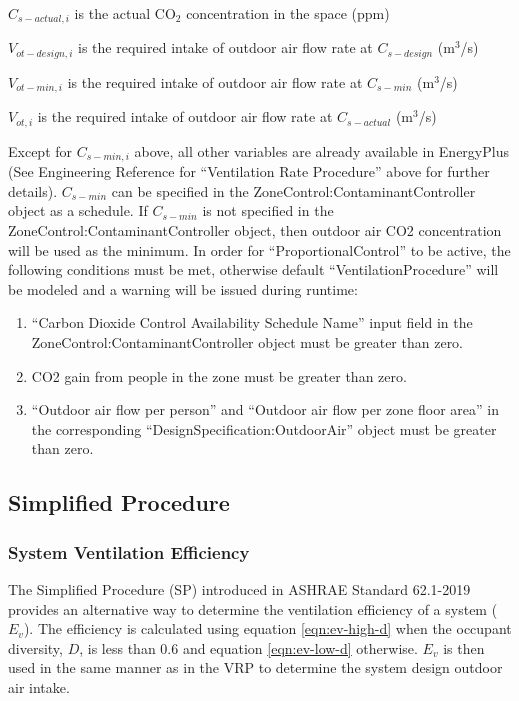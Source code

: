 \({C_{s - actual,i}}\) is the actual CO\(_{2}\) concentration in the space (ppm)

\({V_{ot - design,i}}\) is the required intake of outdoor air flow rate at \({C_{s - design}}\) (m\(^{3}\)/s)

\({V_{ot - min,i}}\) is the required intake of outdoor air flow rate at \({C_{s - min}}\) (m\(^{3}\)/s)

\({V_{ot,i}}\) is the required intake of outdoor air flow rate at \({C_{s - actual}}\) (m\(^{3}\)/s)

Except for \({C_{s - min,i}}\) above, all other variables are already available in EnergyPlus (See Engineering Reference for ``Ventilation Rate Procedure'' above for further details). \({C_{s - min}}\) can be specified in the ZoneControl:ContaminantController object as a schedule. If \({C_{s - min}}\) is not specified in the ZoneControl:ContaminantController object, then outdoor air CO2 concentration will be used as the minimum. In order for ``ProportionalControl'' to be active, the following conditions must be met, otherwise default ``VentilationProcedure'' will be modeled and a warning will be issued during runtime:

\begin{enumerate}
\item ``Carbon Dioxide Control Availability Schedule Name'' input field in the ZoneControl:ContaminantController object must be greater than zero.
\item CO2 gain from people in the zone must be greater than zero.
\item ``Outdoor air flow per person'' and ``Outdoor air flow per zone floor area'' in the corresponding ``DesignSpecification:OutdoorAir'' object must be greater than zero.
\end{enumerate}

\subsection{Simplified Procedure}\label{simplified-procedure}

\subsubsection{System Ventilation Efficiency}\label{sp-calculation-of-system-ventilation-efficiency}

The Simplified Procedure (SP) introduced in ASHRAE Standard 62.1-2019 provides an alternative way to determine the ventilation efficiency of a system (\({E_v}\)). The efficiency is calculated using equation \ref{eqn:ev-high-d} when the occupant diversity, \({D}\), is less than 0.6 and equation \ref{eqn:ev-low-d} otherwise. \({E_v}\) is then used in the same manner as in the VRP to determine the system design outdoor air intake.


